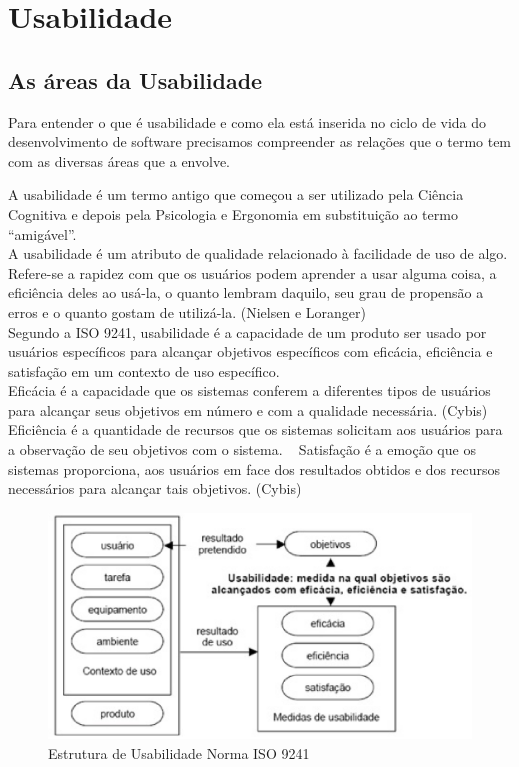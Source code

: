 \chapter{Usabilidade}

\section{As áreas da Usabilidade}

	Para entender o que é usabilidade e como ela está inserida no ciclo de vida do desenvolvimento de software precisamos compreender as relações que o termo tem com as diversas áreas que a envolve. 

	A usabilidade é um termo antigo que começou a ser utilizado pela Ciência Cognitiva e depois pela Psicologia e Ergonomia em substituição ao termo “amigável”. ~\cite{dias2006usabilidade}  \\

	A usabilidade é um atributo de qualidade relacionado à facilidade de uso de algo. Refere-se a rapidez com que os usuários podem aprender a usar alguma coisa, a eficiência deles ao usá-la, o quanto lembram daquilo, seu grau de propensão a erros e o quanto gostam de utilizá-la. (Nielsen e Loranger) \\

	Segundo a ISO 9241, usabilidade é a capacidade de um produto ser usado por usuários específicos para alcançar objetivos específicos com eficácia, eficiência e satisfação em um contexto de uso específico.\\

	Eficácia é a capacidade que os sistemas conferem a diferentes tipos de usuários para alcançar seus objetivos em número e com a qualidade necessária. (Cybis)\\
	Eficiência é a quantidade de recursos que os sistemas solicitam aos usuários para a observação de seu objetivos com o sistema. ~\cite{cybis2010ergonomia}
	Satisfação é a emoção que os sistemas proporciona, aos usuários em face dos resultados obtidos e dos recursos necessários para alcançar tais objetivos. (Cybis)

\begin{figure}[h]
    \centering
    \includegraphics[keepaspectratio=true,scale=0.60]
      {figuras/estruturausabilidade9241.eps}
    \caption{Estrutura de Usabilidade Norma ISO 9241~\cite{cybis2010ergonomia}}
    \label{tdd_ciclo}
\end{figure}

